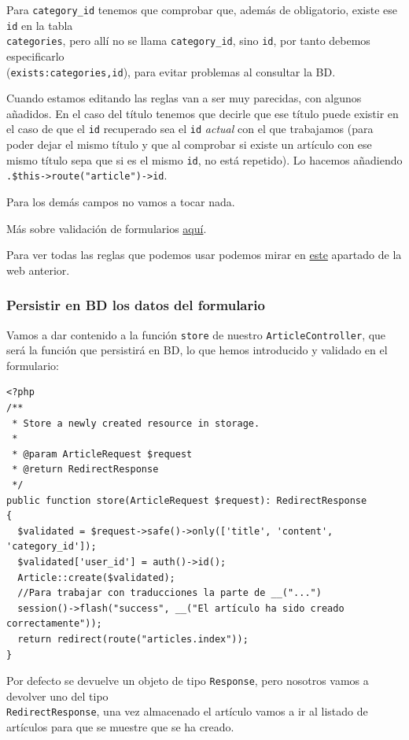 \documentclass[11pt]{article}
\begin{document}
Para \texttt{category\_id} tenemos que comprobar que, además de obligatorio,
existe ese \texttt{id} en la tabla \\[0pt]
\texttt{categories}, pero allí no se llama \texttt{category\_id}, sino \texttt{id}, por
tanto debemos especificarlo \\[0pt]
(\texttt{exists:categories,id}), para evitar problemas al consultar la BD.

Cuando estamos editando las reglas van a ser muy parecidas, con
algunos añadidos. En el caso del título tenemos que decirle que ese
título puede existir en el caso de que el \texttt{id} recuperado sea el \texttt{id}
\emph{actual} con el que trabajamos (para poder dejar el mismo título y que
al comprobar si existe un artículo con ese mismo título sepa que si es
el mismo \texttt{id}, no está repetido). Lo hacemos añadiendo
\texttt{.\$this->route("article")->id}.

Para los demás campos no vamos a tocar nada.

Más sobre validación de formularios \href{https://laravel.com/docs/9.x/validation\#form-request-validation}{aquí}.

Para ver todas las reglas que podemos usar podemos mirar en \href{https://laravel.com/docs/9.x/validation\#available-validation-rules}{este}
apartado de la web anterior.


\subsubsection{Persistir en BD los datos del formulario}
\label{sec:org0f75480}
Vamos a dar contenido a la función \texttt{store} de nuestro
\texttt{ArticleController}, que será la función que persistirá en BD, lo que
hemos introducido y validado en el formulario:
\begin{verbatim}
<?php
/**
 * Store a newly created resource in storage.
 *
 * @param ArticleRequest $request
 * @return RedirectResponse
 */
public function store(ArticleRequest $request): RedirectResponse
{
  $validated = $request->safe()->only(['title', 'content', 'category_id']);
  $validated['user_id'] = auth()->id();
  Article::create($validated);
  //Para trabajar con traducciones la parte de __("...")
  session()->flash("success", __("El artículo ha sido creado correctamente"));
  return redirect(route("articles.index"));
}
\end{verbatim}
Por defecto se devuelve un objeto de tipo \texttt{Response}, pero nosotros
vamos a devolver uno del tipo \\[0pt]
\texttt{RedirectResponse}, una vez almacenado el artículo vamos a ir al
listado de artículos para que se muestre que se ha creado.
\end{document}
